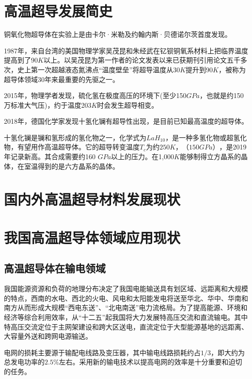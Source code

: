 \documentclass[UTF8, twocolumn]{ctexart}
\begin{document}
\section{高温超导发展简史}

    铜氧化物超导体在实验上是由卡尔·米勒及约翰内斯·贝德诺尔茨首度发现。

    1987年，来自台湾的美国物理学家吴茂昆和朱经武在钇钡铜氧系材料上把临界温度提高到了$90K$以上。以吴茂昆为第一作者的论文\cite{PhysRevLett.58.908}发表以来已获期刊引用论文五千多次，史上第一次超越液态氮沸点“温度壁垒”将超导温度从$30K$提升到$90K$，被称为超导体领域30年来最重要的先驱之一。

    2015年，物理学者发现，硫化氢在极度高压的环境下(至少150$GPa$，也就是约150万标准大气压)，约于温度203$K$时会发生超导相变\cite{drozdov2015conventional}。

    2018年，德国化学家发现十氢化镧有超导性出现，是目前已知最高温度的超导体。

    十氢化镧是镧和氢形成的氢化物之一，化学式为$LaH_{10}$，是一种多氢化物或超氢化物，有望用作高温超导体。它的超导转变温度$T_c$为约$250 K$，$（150 GPa）$，是2019年记录新高。其合成需要约160 $GPa$以上的压力。在1,000$ K$能够制得立方晶系的晶体，在室温得到的是六方晶系的晶体\cite{drozdov2019superconductivity}。

\section{国内外高温超导材料发展现状}

\newpage

\section{我国高温超导体领域应用现状}

    \subsection{高温超导体在输电领域}

    我国能源资源和负荷的地理分布决定了我国电能输送具有划区域、远距离和大规模的特点，西南的水电、西北的火电、风电和太阳能发电将送至华北、华中、华南和南方从而形成大规模“西电东送”、“北电南送”电力流格局\cite{严陆光2014关于发展高温超导输电的建议}。为了提高能源、环境和经济等综合利用效率，从“十二五”起我国将大力发展特高压交流和直流输电。其中特高压交流定位于主网架建设和跨大区送电，直流定位于大型能源基地的远距离、大容量外送和跨网电源输送。

    电网的损耗主要源于输配电线路及变压器，其中输电线路损耗约占$1/3$，即大约为总发电功率的$2.5\%$左右。采用新的输电技术以提高电网的效率是十分重要和迫切的任务。
\end{document}
